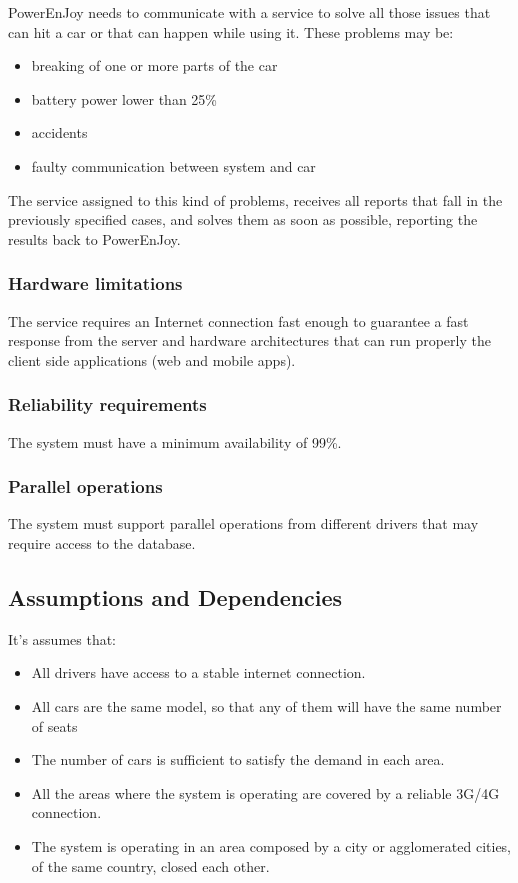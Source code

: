 PowerEnJoy needs to communicate with a service to solve all those issues that can hit a car or that can happen while using it. These problems may be:
\begin{itemize}
	\item breaking of one or more parts of the car
	\item battery power lower than 25\%
	\item accidents
	\item faulty communication between system and car
\end{itemize}
The service assigned to this kind of problems, receives all reports that fall in the previously specified cases, and solves them as soon as possible, reporting the results back to PowerEnJoy.

\subsubsection{Hardware limitations}
The service requires an Internet connection fast enough to guarantee a fast response from the server and hardware architectures that can run properly the client side applications (web and mobile apps).

\subsubsection{Reliability requirements}
The system must have a minimum availability of 99\%.

\subsubsection{Parallel operations}
The system must support parallel operations from different drivers that may require access to the database.

\subsection{Assumptions and Dependencies}

It's assumes that:
\begin{itemize}
	\item All drivers have access to a stable internet connection.
	\item All cars are the same model, so that any of them will have the same number of seats
	\item The number of cars is sufficient to satisfy the demand in each area.
	\item All the areas where the system is operating are covered by a reliable 3G/4G connection.
	\item The system is operating in an area composed by a city or agglomerated cities, of the same country, closed each other.
\end{itemize}

